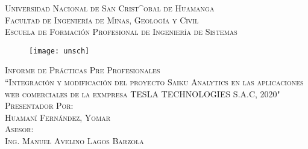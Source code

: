 \newcommand{\mydate}{\formatdate{21}{11}{2020}}

\begin{titlepage}
	\begin{center}
		\textsc{ 
		\Large Universidad Nacional de San Crist^{o}bal de Huamanga\\
		\vspace{5mm}
			Facultad de Ingenier\'{i}a de Minas, Geolog\'{i}a y Civil\\
		\vspace{5mm}
		Escuela de Formaci\'{o}n Profesional de Ingenier\'{i}a de Sistemas\\}
	
			\begin{figure}[h]
				\centering
				\texttt{[image: unsch]}
			\end{figure}
		
		\textsc{ 
			\large Informe de Prácticas Pre Profesionales\\
			\vspace{5mm}
				``Integración y modificación del proyecto Saiku Analytics en las aplicaciones web comerciales de la exmpresa TESLA TECHNOLOGIES S.A.C, 2020"\\
			\vspace{1cm}
			Presentador Por:\\
			Huamaní Fernández, Yomar\\	
			\vspace{5mm}
			Asesor:\\
			Ing. Manuel Avelino Lagos Barzola\\
			\vspace{5mm}
			\mydate
		}
	\end{center}
\end{titlepage}